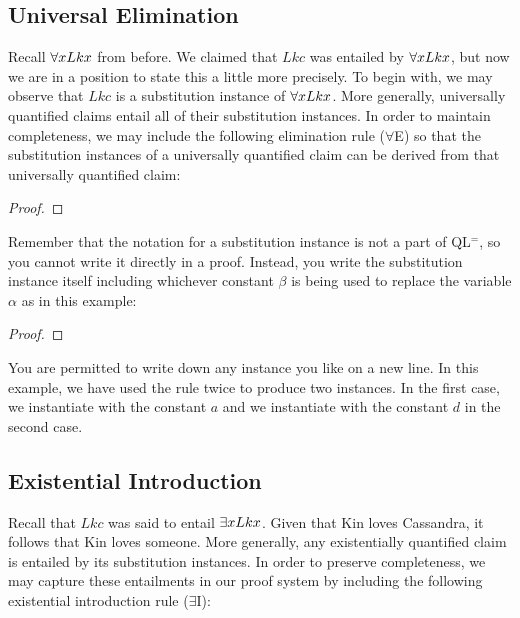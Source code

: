 \subsection{Universal Elimination}
  \label{sec:UniElim}

Recall $\forall x Lkx$ from before.
We claimed that $Lkc$ was entailed by $\forall x Lkx$, but now we are in a position to state this a little more precisely.
To begin with, we may observe that $Lkc$ is a substitution instance of $\forall x Lkx$.
More generally, universally quantified claims entail all of their substitution instances.
In order to maintain completeness, we may include the following elimination rule ($\forall$E) so that the substitution instances of a universally quantified claim can be derived from that universally quantified claim:

\begin{proof}
	  
\end{proof}

Remember that the notation for a substitution instance is not a part of QL$^=$, so you cannot write it directly in a proof.
Instead, you write the substitution instance itself including whichever constant $\beta$ is being used to replace the variable $\alpha$ as in this example:

\begin{proof}
	 \pr{}
	 
	 
\end{proof}

You are permitted to write down any instance you like on a new line. In this example, we have used the rule twice to produce two instances. In the first case, we instantiate with the constant $a$ and we instantiate with the constant $d$ in the second case. 






\subsection{Existential Introduction}
  \label{sec:ExistIntro}

Recall that $Lkc$ was said to entail $\exists x Lkx$.
Given that Kin loves Cassandra, it follows that Kin loves someone.
More generally, any existentially quantified claim is entailed by its substitution instances.
In order to preserve completeness, we may capture these entailments in our proof system by including the following existential introduction rule ($\exists$I):

